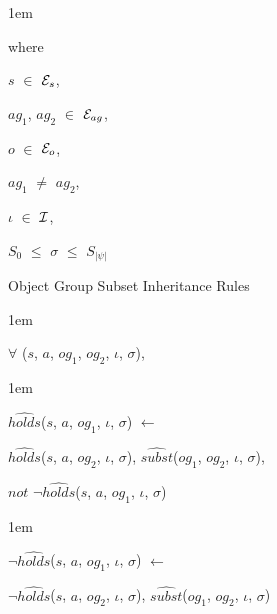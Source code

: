 \documentclass[11pt]{report}
\newenvironment{vquote}
{
  \begin{list}{}{\leftmargin 1em}\item[]
}
{
  \end{list}
}
\begin{document}
\begin{enumerate}
                  \begin{vquote}
                    where

                    \hspace{1em}
                    $s$ $\in$ ${\cal E}_{s}$,

                    \hspace{1em}
                    $ag_1$, $ag_2$ $\in$ ${\cal E}_{ag}$,

                    \hspace{1em}
                    $o$ $\in$ ${\cal E}_{o}$,

                    \hspace{1em}
                    $ag_1$ $\neq$ $ag_2$,

                    \hspace{1em}
                    $\iota$ $\in$ ${\cal I}$,

                    \hspace{1em}
                    $S_{0}$ $\leq$ $\sigma$ $\leq$ $S_{|\psi|}$
                  \end{vquote}

                \item
                  Object Group Subset Inheritance Rules

                  \begin{vquote}
                    $\forall$ ($s$, $a$, $og_1$, $og_2$, $\iota$, $\sigma$),
                  \end{vquote}

                  \begin{vquote}
                    $\hat{holds}$($s$, $a$, $og_1$, $\iota$, $\sigma$)
                    $\leftarrow$

                    \hspace{1em}
                    $\hat{holds}$($s$, $a$, $og_2$, $\iota$, $\sigma$),
                    $\hat{subst}$($og_1$, $og_2$, $\iota$, $\sigma$),

                    \hspace{1em}
                    $not$ $\lnot\hat{holds}$($s$, $a$, $og_1$, $\iota$, $\sigma$)
                  \end{vquote}

                  \begin{vquote}
                    $\lnot\hat{holds}$($s$, $a$, $og_1$, $\iota$, $\sigma$)
                    $\leftarrow$

                    \hspace{1em}
                    $\lnot\hat{holds}$($s$, $a$, $og_2$, $\iota$, $\sigma$),
                    $\hat{subst}$($og_1$, $og_2$, $\iota$, $\sigma$)
                  \end{vquote}


\end{enumerate}
\end{document}

